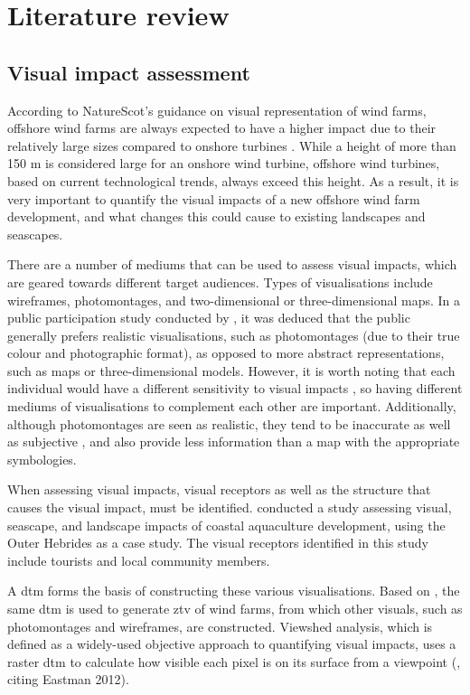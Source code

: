 \chapter{Literature review}

\section{Visual impact assessment}

According to NatureScot's guidance on visual representation of wind farms, offshore wind farms are always expected to have a higher impact due to their relatively large sizes compared to onshore turbines \autocite{naturescot-visual}. While a height of more than 150 m is considered large for an onshore wind turbine, offshore wind turbines, based on current technological trends, always exceed this height. As a result, it is very important to quantify the visual impacts of a new offshore wind farm development, and what changes this could cause to existing landscapes and seascapes.

There are a number of mediums that can be used to assess visual impacts, which are geared towards different target audiences. Types of visualisations include wireframes, photomontages, and two-dimensional or three-dimensional maps. In a public participation study conducted by \cite{berry2011}, it was deduced that the public generally prefers realistic visualisations, such as photomontages (due to their true colour and photographic format), as opposed to more abstract representations, such as maps or three-dimensional models. However, it is worth noting that each individual would have a different sensitivity to visual impacts \autocite{falconer2013,appleton2003}, so having different mediums of visualisations to complement each other are important. Additionally, although photomontages are seen as realistic, they tend to be inaccurate as well as subjective \autocite{falconer2013}, and also provide less information than a map with the appropriate symbologies.

When assessing visual impacts, visual receptors as well as the structure that causes the visual impact, must be identified. \cite{falconer2013} conducted a study assessing visual, seascape, and landscape impacts of coastal aquaculture development, using the Outer Hebrides as a case study. The visual receptors identified in this study include tourists and local community members.

A \gls{dtm} forms the basis of constructing these various visualisations. Based on \cite{naturescot-visual}, the same \gls{dtm} is used to generate \gls{ztv} of wind farms, from which other visuals, such as photomontages and wireframes, are constructed. Viewshed analysis, which is defined as a widely-used objective approach to quantifying visual impacts, uses a raster \gls{dtm} to calculate how visible each pixel is on its surface from a viewpoint (\cite{falconer2013}, citing Eastman 2012).

